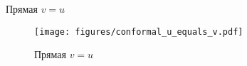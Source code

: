 \begin{frame}{Прямая \(v = u\)}
	\begin{figure}
		\centering
		\texttt{[image: figures/conformal\_u\_equals\_v.pdf]}
		\caption{Прямая \(v=u\)}\label{fig:conformal_u_equals_v}
	\end{figure}
\end{frame}
